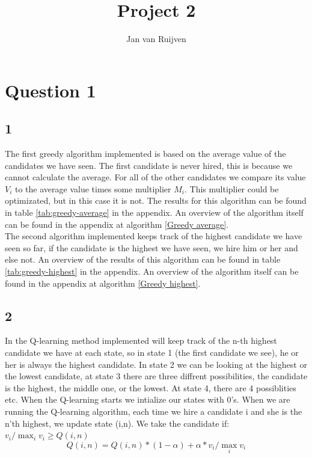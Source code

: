 \documentclass{article}
\title{Project 2}
\author{Jan van Ruijven}
\begin{document}
\maketitle %

\section*{Question 1}
\subsection*{1}
The first greedy algorithm implemented is based on the average value of the candidates we have seen. The first candidate is never hired, this is because we cannot calculate the average. For all of the other candidates we compare its value $V_i$ to the average value times some multiplier $M_i$. This multiplier could be optimizated, but in this case it is not. The results for this algorithm can be found in table \ref{tab:greedy-average} in the appendix. An overview of the algorithm itself can be found in the appendix at algorithm \ref{Greedy average}. \\ 
The second algorithm implemented keeps track of the highest candidate we have seen so far, if the candidate is the highest we have seen, we hire him or her and else not. An overview of the results of this algorithm can be found in table \ref{tab:greedy-highest} in the appendix. An overview of the algorithm itself can be found in the appendix at algorithm \ref{Greedy highest}. 
\subsection*{2}
In the Q-learning method implemented will keep track of the n-th highest candidate we have at each state, so in state 1 (the first candidate we see), he or her is always the highest candidate. In state 2 we can be looking at the highest or the lowest candidate, at state 3 there are three diffrent possibilities, the candidate is the highest, the middle one, or the lowest. At state 4, there are 4 possiblities etc. When the Q-learning starts we intialize our states with 0's. When we are running the Q-learning algorithm, each time we hire a candidate i and she is the n'th highest, we update state (i,n). We take the candidate if: $v_i / \max_{i} v_i \geq Q(i, n)$
\begin{equation}
	Q(i, n) = Q(i, n) * (1-\alpha) + \alpha * v_i / \max_{i} v_i 	
	\label{eq:State-Update Ex1}
\end{equation}
\end{document}
